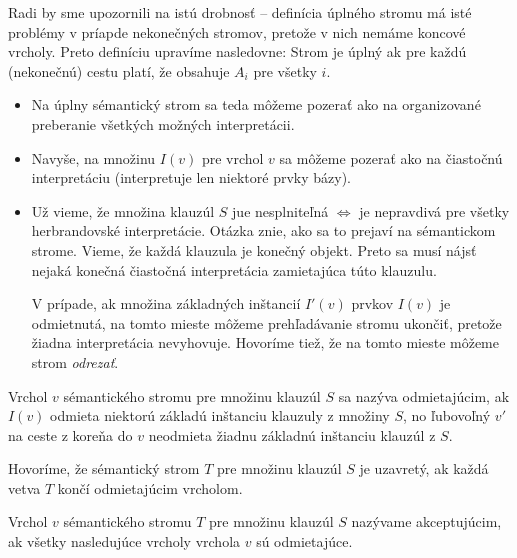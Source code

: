 \begin{poznamka}
    Radi by sme upozornili na istú drobnosť -- definícia úplného stromu má
    isté problémy v príapde nekonečných stromov, pretože v nich nemáme
    koncové vrcholy. Preto definíciu upravíme nasledovne:
    Strom je úplný ak pre každú (nekonečnú) cestu platí, že obsahuje $A_i$
    pre všetky $i$.
\end{poznamka}

\begin{poznamka}
    \noindent
    \begin{itemize}
    \item Na úplny sémantický strom sa teda môžeme pozerať ako na organizované
        preberanie všetkých možných interpretácii.
    \item Navyše, na množinu $I(v)$ pre vrchol $v$ sa môžeme pozerať ako na
        čiastočnú interpretáciu (interpretuje len niektoré prvky bázy).
    \item Už vieme, že množina klauzúl $S$ jue nesplniteľná $\iff$
        je nepravdivá pre všetky herbrandovské interpretácie. Otázka znie,
        ako sa to prejaví na sémantickom strome. Vieme, že každá klauzula
        je konečný objekt. Preto sa musí nájsť nejaká konečná čiastočná
        interpretácia zamietajúca túto klauzulu.

        V prípade, ak množina základných inštancií $I'(v)$ prvkov $I(v)$
        je odmietnutá, na tomto mieste môžeme prehľadávanie stromu ukončiť,
        pretože žiadna interpretácia nevyhovuje. Hovoríme tiež,
        že na tomto mieste môžeme strom \emph{odrezať}.
    \end{itemize}
\end{poznamka}

\begin{definicia}
    Vrchol $v$ sémantického stromu pre množinu klauzúl $S$ sa
    nazýva odmietajúcim, ak  $I(v)$ odmieta niektorú základú inštanciu
    klauzuly z množiny $S$, no ľubovoľný  $v'$  na ceste z koreňa do $v$
    neodmieta žiadnu základnú inštanciu klauzúl z $S$.
\end{definicia}

\begin{definicia}
    Hovoríme, že sémantický strom $T$ pre množinu klauzúl $S$
    je uzavretý, ak každá vetva $T$ končí odmietajúcim vrcholom.
\end{definicia}

\begin{definicia}
    Vrchol $v$ sémantického stromu $T$ pre  množinu klauzúl $S$ 
    nazývame akceptujúcim, ak všetky nasledujúce
    vrcholy vrchola $v$ sú odmietajúce.
\end{definicia}

